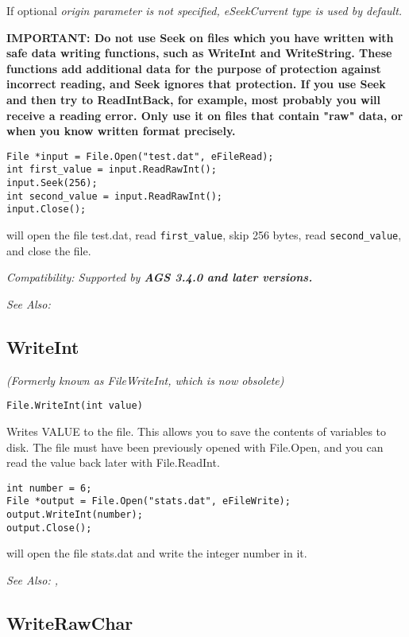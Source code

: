 If optional \it{origin} parameter is not specified, eSeekCurrent type is used by default.

\bf{IMPORTANT:} Do not use Seek on files which you have written with safe data writing functions,
such as WriteInt and WriteString. These functions add additional data for the purpose of
protection against incorrect reading, and Seek ignores that protection. If you use Seek and then try
to ReadIntBack, for example, most probably you will receive a reading error. Only use it on files
that contain "raw" data, or when you know written format precisely.

\begin{verbatim}
File *input = File.Open("test.dat", eFileRead);
int first_value = input.ReadRawInt();
input.Seek(256);
int second_value = input.ReadRawInt();
input.Close();
\end{verbatim}
will open the file test.dat, read \verb$first_value$, skip 256 bytes, read \verb$second_value$, and close the file.

\it{Compatibility:} Supported by \bf{AGS 3.4.0} and later versions.

\it{See Also:} 


\subsection{WriteInt}\label{File.WriteInt}%

\it{(Formerly known as FileWriteInt, which is now obsolete)}

\begin{verbatim}
File.WriteInt(int value)
\end{verbatim}
Writes VALUE to the file. This allows you to save the contents of
variables to disk. The file must have been previously opened with File.Open,
and you can read the value back later with File.ReadInt.

\begin{verbatim}
int number = 6;
File *output = File.Open("stats.dat", eFileWrite);
output.WriteInt(number);
output.Close();
\end{verbatim}
will open the file stats.dat and write the integer number in it.

\it{See Also:} , 


\subsection{WriteRawChar}\label{File.WriteRawChar}%

